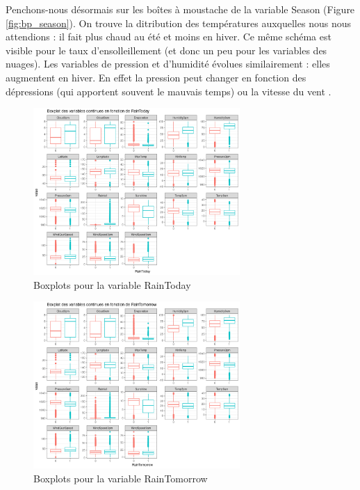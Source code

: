 \documentclass{article}
\begin{document}
Penchons-nous désormais sur les boîtes à moustache de la variable Season (Figure \ref{fig:bp_season}). On trouve la ditribution des températures auxquelles nous nous attendions : il fait plus chaud au été et moins en hiver. Ce même schéma est visible pour le taux d'ensolleillement (et donc un peu pour les variables des nuages). Les variables de pression et d'humidité évolues similairement : elles augmentent en hiver. En effet la pression peut changer en fonction des dépressions (qui apportent souvent le mauvais temps) ou la vitesse du vent \cite{frwiki:190112465}.

\begin{figure}[htp]
    \centering
    \includegraphics[width=0.7\textwidth]{Images/boxplots/boxplot_RainToday.png}
    \caption{Boxplots pour la variable RainToday}
    \label{fig:bp_raintoday}
\end{figure}

\begin{figure}[htp]
    \centering
    \includegraphics[width=0.7\textwidth]{Images/boxplots/boxplot_RainTomorrow.png}
    \caption{Boxplots pour la variable RainTomorrow}
    \label{fig:bp_raintomorrow}
\end{figure}
\end{document}
